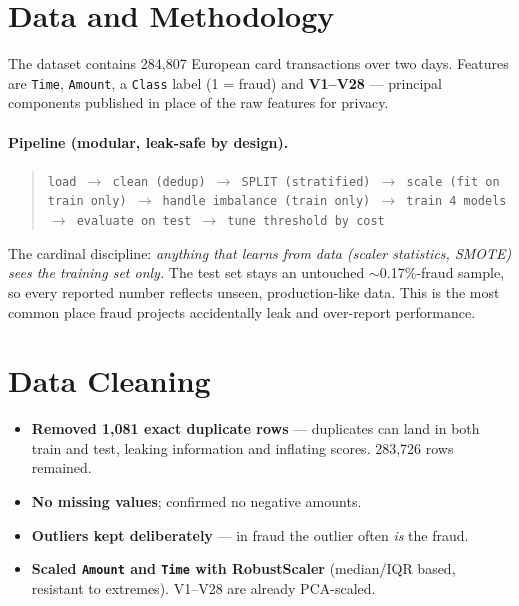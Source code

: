 \documentclass[11pt,a4paper]{article}
\begin{document}
\section{Data and Methodology}
The dataset contains 284,807 European card transactions over two days. Features
are \texttt{Time}, \texttt{Amount}, a \texttt{Class} label (1 = fraud) and
\textbf{V1--V28} --- principal components published in place of the raw features
for privacy.

\paragraph{Pipeline (modular, leak-safe by design).}
\begin{quote}
\texttt{load $\rightarrow$ clean (dedup) $\rightarrow$ SPLIT (stratified)
$\rightarrow$ scale (fit on train only) $\rightarrow$ handle imbalance (train only)
$\rightarrow$ train 4 models $\rightarrow$ evaluate on test $\rightarrow$ tune
threshold by cost}
\end{quote}
The cardinal discipline: \emph{anything that learns from data (scaler statistics,
SMOTE) sees the training set only.} The test set stays an untouched
$\sim$0.17\%-fraud sample, so every reported number reflects unseen,
production-like data. This is the most common place fraud projects accidentally
leak and over-report performance.

\section{Data Cleaning}
\begin{itemize}[leftmargin=1.4em]
  \item \textbf{Removed 1,081 exact duplicate rows} --- duplicates can land in
        both train and test, leaking information and inflating scores. 283,726
        rows remained.
  \item \textbf{No missing values}; confirmed no negative amounts.
  \item \textbf{Outliers kept deliberately} --- in fraud the outlier often
        \emph{is} the fraud.
  \item \textbf{Scaled \texttt{Amount} and \texttt{Time} with RobustScaler}
        (median/IQR based, resistant to extremes). V1--V28 are already
        PCA-scaled.
\end{itemize}
\end{document}
